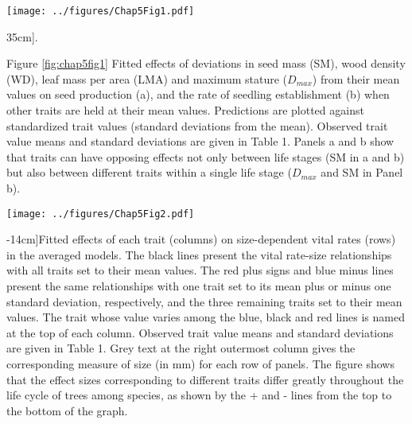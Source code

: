 \documentclass[b5paper,justified]{tufte-book} %
\begin{document}
\begin{fullwidth}
\begin{figure*}
\hspace*{1cm}\texttt{[image: ../figures/Chap5Fig1.pdf]}
\caption[Fitted effects of deviations in seed mass (SM), wood density (WD), leaf mass per area (LMA) and maximum stature ($D_{max}$)][35cm]{.}
\label{fig:chap5fig1}
\hspace*{1cm} \begin{minipage}{12cm}
\small Figure \ref{fig:chap5fig1} Fitted effects of deviations in seed mass (SM), wood density (WD), leaf mass per area (LMA) and maximum stature ($D_{max}$) from their mean values on seed production (a), and the rate of seedling establishment (b) when other traits are held at their mean values. Predictions are plotted against standardized trait values (standard deviations from the mean). Observed trait value means and standard deviations are given in Table 1. Panels a and b show that traits can have opposing effects not only between life stages (SM in a and b) but also between different traits within a single life stage ($D_{max}$ and SM in Panel b).
\end{minipage} 
\end{figure*}


\begin{landscape}
\begin{figure*}
\hspace*{3cm}\texttt{[image: ../figures/Chap5Fig2.pdf]}
\caption[Fitted effects of each trait on size-dependent vital rates.][-14cm]{Fitted effects of each trait (columns) on size-dependent vital rates (rows) in the averaged models. The black lines present the vital rate-size relationships with all traits set to their mean values. The red plus signs and blue minus lines present the same relationships with one trait set to its mean plus or minus one standard deviation, respectively, and the three remaining traits set to their mean values. The trait whose value varies among the blue, black and red lines is named at the top of each column. Observed trait value means and standard deviations are given in Table 1. Grey text at the right outermost column gives the corresponding measure of size (in mm) for each row of panels. The figure shows that the effect sizes corresponding to different traits differ greatly throughout the life cycle of trees among species, as shown by the + and - lines from the top to the bottom of the graph.}
\label{fig:chap5fig2}
\end{figure*}
\end{landscape}




\end{fullwidth}
\end{document}
